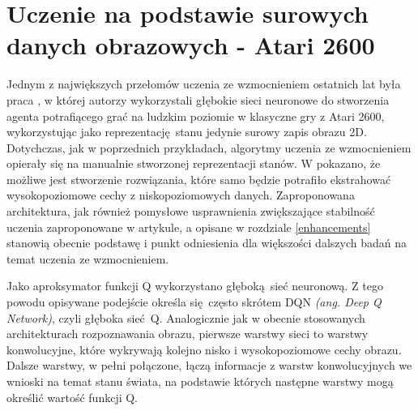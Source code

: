 \section{Uczenie na podstawie surowych danych obrazowych - Atari 2600}

Jednym z największych przełomów uczenia ze wzmocnieniem ostatnich lat była praca \break \cite{mnih2015human}, w której autorzy wykorzystali głębokie sieci neuronowe do stworzenia agenta potrafiącego grać na ludzkim poziomie w klasyczne gry z Atari 2600, wykorzystując jako reprezentację stanu jedynie surowy zapis obrazu 2D. Dotychczas, jak w poprzednich przykładach, algorytmy uczenia ze wzmocnieniem opierały się na manualnie stworzonej reprezentacji stanów. W \cite{mnih2015human} pokazano, że możliwe jest stworzenie rozwiązania, które samo będzie potrafiło ekstrahować wysokopoziomowe cechy z niskopoziomowych danych. Zaproponowana architektura, jak również pomysłowe usprawnienia zwiększające stabilność uczenia zaproponowane w artykule, a opisane w rozdziale \ref {enhancements} stanowią obecnie podstawę i punkt odniesienia dla większości dalszych badań na temat uczenia ze wzmocnieniem.

Jako aproksymator funkcji Q wykorzystano głęboką sieć neuronową. Z tego powodu opisywane podejście określa się często skrótem DQN \textit{(ang. Deep Q Network)}, czyli głęboka sieć Q. Analogicznie jak w obecnie stosowanych architekturach rozpoznawania obrazu, pierwsze warstwy sieci to warstwy konwolucyjne, które wykrywają kolejno nisko i wysokopoziomowe cechy obrazu. Dalsze warstwy, w pełni połączone, łączą informacje z warstw konwolucyjnych we wnioski na temat stanu świata, na podstawie których następne warstwy mogą określić wartość funkcji Q.


